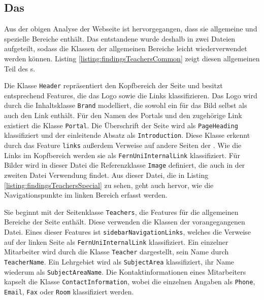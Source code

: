 \subsection{Das {\classificationModel}}
    \label{section:findingsTeachersClassificationModel}
    Aus der obigen Analyse der Webseite ist hervorgegangen,
    dass sie allgemeine und spezielle Bereiche enthält.
    Das entstandene {\classificationModel} wurde deshalb in zwei Dateien aufgeteilt,
    sodass die Klassen der allgemeinen Bereiche leicht wiederverwendet werden können.
    Listing \ref{listing:findingsTeachersCommon} zeigt diesen allgemeinen
    Teil des {\classificationModel}s.

    

    Die Klasse \texttt{Header} repräsentiert den Kopfbereich der Seite
    und besitzt entsprechend Features,
    die das Logo sowie die Links klassifizieren.
    Das Logo wird durch die Inhaltsklasse \texttt{Brand} modelliert,
    die sowohl ein {} für das Bild selbst als auch den Link enthält.
    Für den Namen des Portals und den zugehörige Link existiert die Klasse \texttt{Portal}.
    Die Überschrift der Seite wird als \texttt{PageHeading} klassifiziert und
    der einleitende Absatz als \texttt{Introduction}.
    Diese Klasse erkennt durch das Feature \texttt{links} außerdem Verweise auf andere Seiten der {\fernUni}.
    Wie die Links im Kopfbereich werden sie als \texttt{FernUniInternalLink} klassifiziert.
    Für Bilder wird in dieser Datei die Referenzklasse \texttt{Image} definiert,
    die auch in der zweiten Datei Verwendung findet.
    Aus dieser Datei, die in Listing \ref{listing:findingsTeachersSpecial} zu sehen,
    geht auch hervor, wie die Navigationspunkte im linken Bereich erfasst werden.

    

    Sie beginnt mit der Seitenklasse \texttt{Teachers},
    die Features für die allgemeinen Bereiche der Seite enthält.
    Diese verwenden die Klassen der vorangegangenen Datei.
    Eines dieser Features ist \texttt{sidebarNavigationLinks},
    welches die Verweise auf der linken Seite als \texttt{FernUniInternalLink}
    klassifiziert.
    Ein einzelner Mitarbeiter wird durch die Klasse \texttt{Teacher} dargestellt,
    sein Name durch \texttt{TeacherName}.
    Ein Lehrgebiet wird als \texttt{SubjectArea} klassifiziert,
    ihr Name wiederum als \texttt{SubjectAreaName}.
    Die Kontaktinformationen eines Mitarbeiters kapselt die Klasse \texttt{ContactInformation},
    wobei die einzelnen Angaben als \texttt{Phone}, \texttt{Email}, \texttt{Fax} oder \texttt{Room}
    klassifiziert werden.

